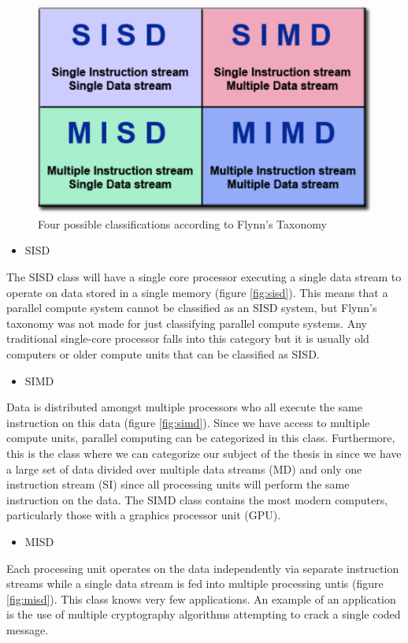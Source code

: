 \documentclass[a4paper, 11pt]{report}
\begin{document}
	\begin{figure}[ht]
		\centering
		\includegraphics[scale=.5]{images/flynnsTaxonomy.pdf}
		\caption{Four possible classifications according to Flynn's Taxonomy}
		\label{fig:flynnTaxonomy}
	\end{figure}
	
	\begin{itemize}
		\item SISD
	\end{itemize}
The SISD class will have a single core processor executing a single data stream to operate on data stored in a single memory (figure \ref{fig:sisd}). This means that a parallel compute system cannot be classified as an SISD system, but Flynn's taxonomy was not made for just classifying parallel compute systems. Any traditional single-core processor falls into this category but it is usually old computers or older compute units that can be classified as SISD.
	
	\begin{itemize}
		\item SIMD
	\end{itemize}
Data is distributed amongst multiple processors who all execute the same instruction on this data (figure \ref{fig:simd}). Since we have access to multiple compute units, parallel computing can be categorized in this class. Furthermore, this is the class where we can categorize our subject of the thesis in since we have a large set of data divided over multiple data streams (MD) and only one instruction stream (SI) since all processing units will perform the same instruction on the data. The SIMD class contains the most modern computers, particularly those with a graphics processor unit (GPU).

	\begin{itemize}
		\item MISD
	\end{itemize}
Each processing unit operates on the data independently via separate instruction streams while a single data stream is fed into multiple processing untis (figure \ref{fig:misd}). This class knows very few applications. An example of an application is the use of multiple cryptography algorithms attempting to crack a single coded message.
	
\end{document}
